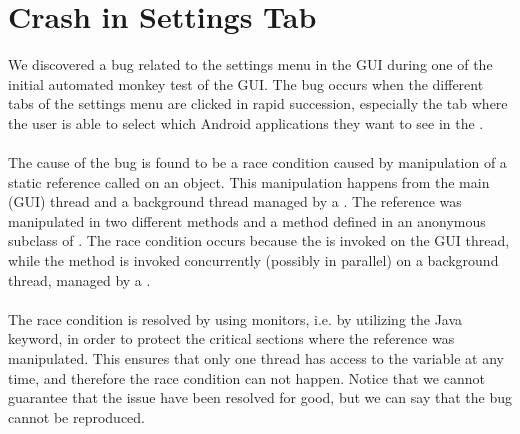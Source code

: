 \section{Crash in Settings Tab}
\label{sec:crash_in_settings_tab}

We discovered a bug related to the settings menu in the \launcher GUI during one of the initial automated monkey test of the GUI. The bug occurs when the different tabs of the settings menu are clicked in rapid succession, especially the tab where the user is able to select which Android applications they want to see in the \giraf \launcher.
\\\\
The cause of the bug is found to be a race condition caused by manipulation of a static reference called  on an  object. This manipulation happens from the main (GUI) thread and a background thread managed by a . The reference was manipulated in two different methods  and a method  defined in an anonymous subclass of . The race condition occurs because the  is invoked on the GUI thread, while the  method is invoked concurrently (possibly in parallel) on a background thread, managed by a .
\\\\
The race condition is resolved by using monitors, i.e. by utilizing the  Java keyword, in order to protect the critical sections where the  reference was manipulated. This ensures that only one thread has access to the variable at any time, and therefore the race condition can not happen. Notice that we cannot guarantee that the issue have been resolved for good, but we can say that the bug cannot be reproduced.
